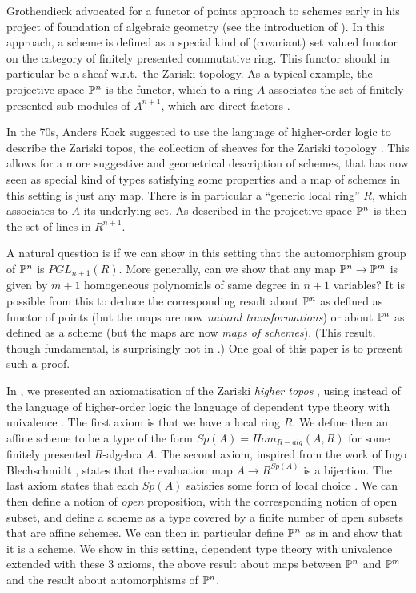 Grothendieck advocated for a functor of points approach to schemes early in his
project of foundation of algebraic geometry (see the introduction of \cite{EGAIV1}).
In this approach, a scheme is defined as a special kind of (covariant) set valued functor
on the category of finitely presented commutative ring. This functor should in particular
be a sheaf w.r.t.\ the Zariski topology. As a typical example, the projective space $\mathbb{P}^n$
is the functor, which to a ring $A$ associates the set of finitely presented sub-modules of $A^{n+1}$, which are direct factors \cite{Demazure,Eisenbud,Jantzen}.

In the 70s, Anders Kock suggested to use the language of higher-order logic \cite{Church40}
to describe the Zariski topos, the collection of sheaves for the Zariski topology \cite{Kock74,kockreyes}.
This allows for
a more suggestive and geometrical description of schemes, that has now seen as special kind
of types satisfying some properties and a map of schemes in this setting is just any map.
There is in particular a ``generic
local ring'' $R$, which associates to $A$ its underlying set. As described in \cite{kockreyes}
the projective space $\mathbb{P}^n$ is then the set of lines in $R^{n+1}$.

A natural question is if we can show in this setting that the automorphism group of $\mathbb{P}^n$
is  $PGL_{n+1}(R)$.
More generally, can we show that any map $\mathbb{P}^n\rightarrow \mathbb{P}^m$ is given by $m+1$ homogeneous
polynomials of same degree in $n+1$ variables?
It is possible from this to deduce the corresponding result about $\mathbb{P}^n$ as defined
as functor of points (but the maps are now {\em natural transformations}) or about $\mathbb{P}^n$ as
defined as a scheme (but the maps are now {\em maps of schemes}).
(This result, though fundamental, is surprisingly not in \cite{Hartshorne}.)
One goal of this paper is to present such a proof.

In \cite{draft}, we presented an axiomatisation of the Zariski {\em higher topos} \cite{lurie-htt},
using instead of the language of higher-order logic the language of dependent type theory
with univalence \cite{hott}. The first axiom is that we have a local ring $R$. We define
then an affine scheme to be a type of the form $Sp(A) = Hom_{R-alg}(A,R)$ for some finitely presented
$R$-algebra $A$. The second axiom, inspired from the work of Ingo Blechschmidt \cite{ingo-thesis},
states that the evaluation map $A\rightarrow R^{Sp(A)}$ is a bijection. The last axiom states
that each $Sp(A)$ satisfies some form of local choice \cite{draft}. We can then define a notion
of {\em open} proposition, with the corresponding notion of open subset, and define a scheme as a type
covered by a finite number of open subsets that are affine schemes. We can then in particular define
$\mathbb{P}^n$ as in \cite{kockreyes} and show that it is a scheme.
We show in this setting, dependent type theory with univalence extended with these 3 axioms,
the above result about maps between $\mathbb{P}^n$ and $\mathbb{P}^m$ and the result about automorphisms of $\mathbb{P}^n$.

